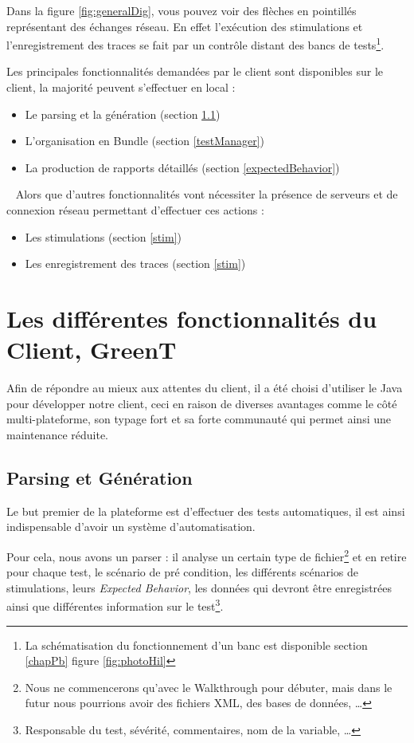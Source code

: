 		Dans la figure \ref{fig:generalDig}, vous pouvez voir des flèches en pointillés représentant des échanges réseau. En effet
		l'exécution des stimulations et l'enregistrement des traces se fait par un contrôle distant des bancs de tests\footnote{La
		schématisation du fonctionnement d'un banc est disponible section \ref{chapPb} figure \ref{fig:photoHil}}.

		Les principales fonctionnalités demandées par le client sont disponibles sur le client, la majorité peuvent s'effectuer en local : 
		\begin{itemize}
			\item Le parsing et la génération (section \ref{generation})
			\item L'organisation en Bundle (section \ref{testManager})
			\item La production de rapports détaillés (section \ref{expectedBehavior})
		\end{itemize}~\newline
		Alors que d'autres fonctionnalités vont nécessiter la présence de serveurs et de connexion réseau permettant d'effectuer ces actions
		: 
		\begin{itemize}
			\item Les stimulations (section \ref{stim})
			\item Les enregistrement des traces (section \ref{stim})
		\end{itemize}

		\section{Les différentes fonctionnalités du Client, GreenT}
		Afin de répondre au mieux aux attentes du client, il a été choisi d'utiliser le Java pour développer notre client, ceci en raison de
		diverses avantages comme le côté multi-plateforme, son typage fort et sa forte communauté qui permet ainsi une maintenance réduite. 

	\subsection{Parsing et Génération}\label{generation}
	Le but premier de la plateforme est d'effectuer des tests automatiques, il est ainsi indispensable d'avoir un système d'automatisation.

	Pour cela, nous avons un parser : il analyse un certain type de fichier\footnote{Nous ne commencerons qu'avec le Walkthrough pour débuter, mais dans le futur nous pourrions avoir des fichiers XML, des bases de données, \ldots} et en retire pour chaque test, le scénario de pré condition, les différents scénarios de stimulations, leurs \textit{Expected Behavior}, les données qui devront être enregistrées ainsi que différentes information sur le test\footnote{Responsable du test, sévérité, commentaires, nom de la variable, \ldots}.


